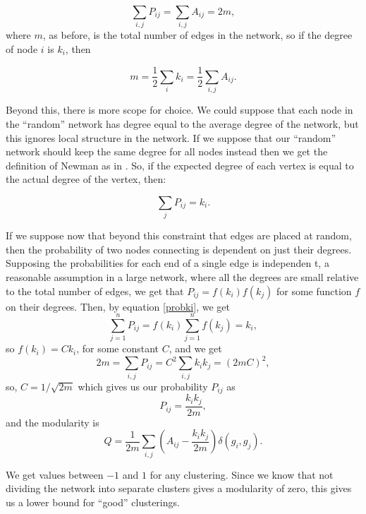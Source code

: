 \documentclass[a4paper,12pt]{report}
\begin{document}
\begin{equation}
\sum_{i,j}P_{ij} = \sum_{i,j} A_{ij} = 2m,
\end{equation}
where $m$, as before, is the total number of edges in the network, so if the 
degree of node $i$ is $k_i$, then

\begin{equation}
m = \frac{1}{2}\sum_ik_i = \frac{1}{2}\sum_{i,j}A_{ij}.
\end{equation}

Beyond this, there is more scope for choice.  We could suppose that each node 
in the ``random'' network has degree equal to the average degree of the 
network, but this ignores local structure in the network.  If we suppose that 
our ``random'' network should keep the same degree for all nodes instead then 
we get the definition of Newman as in \cite{Newman2006a}.  So, if the expected 
degree of each vertex is equal to the actual degree of the vertex, then:

\begin{equation}
\sum_j P_{ij} = k_i.
\label{probki}
\end{equation}

If we suppose now that beyond this constraint that edges are placed at random, 
then the probability of two nodes connecting is dependent on just their 
degrees. Supposing the probabilities for each end of a single edge is independen
t, a reasonable assumption in a large network, where all the degrees are small 
relative to the total number of edges, we get that $P_{ij} = f(k_i)f(k_j)$ for 
some function $f$ on their degrees.  Then, by equation \ref{probki}, we get
\begin{equation}
\sum_{j=1}^{n}P_{ij} = f(k_i)\sum_{j=1}^nf(k_j)=k_i,
\end{equation}
so $f(k_i) = Ck_i$, for some constant $C$, and we get
\begin{equation}
2m = \sum_{i,j}P_{ij} = C^2\sum_{i,j}k_ik_j = (2mC)^2,
\end{equation}
so, $C = 1/\sqrt{2m}$ which gives us our probability $P_{ij}$ as
\begin{equation}
P_{ij} = \frac{k_ik_j}{2m},
\end{equation}
and the modularity is
\begin{equation}
Q= \frac{1}{2m}\sum_{i,j} \left(A_{ij} -
\frac{k_ik_j}{2m}\right)\delta(g_i,g_j).
\end{equation}

 We get values between $-1$ and $1$ for any clustering.  Since we know that not 
dividing the network into separate clusters gives a modularity of zero, this 
gives us a lower bound for ``good'' clusterings.
\end{document}
